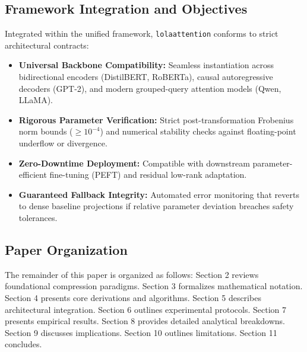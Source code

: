 \subsection{Framework Integration and Objectives}
Integrated within the unified framework, \texttt{lolaattention} conforms to strict architectural contracts:
\begin{itemize}
\item \textbf{Universal Backbone Compatibility:} Seamless instantiation across bidirectional encoders (DistilBERT, RoBERTa), causal autoregressive decoders (GPT-2), and modern grouped-query attention models (Qwen, LLaMA).
\item \textbf{Rigorous Parameter Verification:} Strict post-transformation Frobenius norm bounds ($\ge 10^{-4}$) and numerical stability checks against floating-point underflow or divergence.
\item \textbf{Zero-Downtime Deployment:} Compatible with downstream parameter-efficient fine-tuning (PEFT) and residual low-rank adaptation.
\item \textbf{Guaranteed Fallback Integrity:} Automated error monitoring that reverts to dense baseline projections if relative parameter deviation breaches safety tolerances.
\end{itemize}

\subsection{Paper Organization}
The remainder of this paper is organized as follows: Section 2 reviews foundational compression paradigms. Section 3 formalizes mathematical notation. Section 4 presents core derivations and algorithms. Section 5 describes architectural integration. Section 6 outlines experimental protocols. Section 7 presents empirical results. Section 8 provides detailed analytical breakdowns. Section 9 discusses implications. Section 10 outlines limitations. Section 11 concludes.
